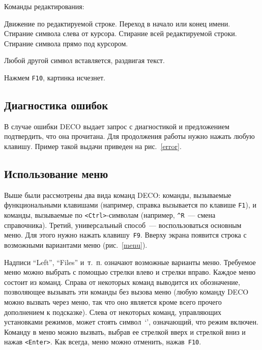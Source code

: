 Команды редактирования:
\begin{example}
\litem{$\leftarrow$, $\rightarrow$}
Движение по редактируемой строке.
Переход в начало или конец имени.
Стирание символа слева от курсора.
Стирание всей редактируемой строки.
Стирание символа прямо под курсором.
\end{example}
Любой другой символ вставляется, раздвигая текст.

Нажмем {\tt F10}, картинка исчезнет.

\subsection{Диагностика ошибок}

В случае ошибки DECO выдает запрос с диагностикой и предложением подтвердить,
что она прочитана. Для продолжения работы нужно нажать любую клавишу.
Пример такой выдачи приведен на рис.~\ref{error}.


\subsection{Использование меню}

Выше были рассмотрены два вида команд DECO: команды, вызываемые
функциональными клавишами (например, справка вызывается по клавише
{\tt F1}), и команды, вызываемые по {\tt <Ctrl>}-символам
(например, {\tt \^{}R}~--- смена справочника). Третий, универсальный
способ~--- воспользоваться основным меню. Для этого нужно нажать
клавишу~{\tt F9}. Вверху экрана появится строка с возможными вариантами
меню (рис.~\ref{menu}).


Надписи ``Left'', ``Files'' и~т.~п. означают
возможные варианты меню. Требуемое меню можно выбрать с помощью
стрелки влево и стрелки вправо. Каждое меню состоит
из команд. Справа от некоторых команд выводится их обозначение,
позволяющее вызывать эти команды без вызова меню (любую команду DECO
можно вызвать через меню, так что оно является кроме всего
прочего дополнением к подсказке). Слева от некоторых команд, управляющих
установками режимов, может стоять символ~`{\tt *}', означающий, что
режим включен. Команду в меню можно вызвать,
выбрав ее стрелкой вверх и стрелкой вниз и нажав
{\tt <Enter>}. Как всегда, меню можно отменить, нажав~{\tt F10}.

